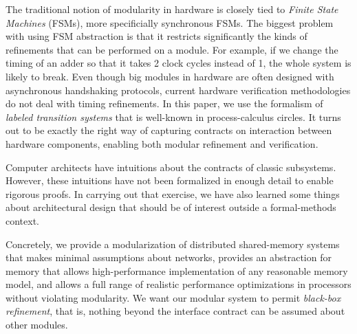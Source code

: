 The traditional notion of modularity in hardware is closely tied to
\emph{Finite State Machines} (FSMs), more specificially synchronous FSMs. The biggest
problem with using FSM abstraction is that it restricts significantly the kinds of
refinements that can be performed on a module. For example, if we change the
timing of an adder so that it takes 2 clock cycles instead of 1, the whole
system is likely to break. Even though big modules in hardware are often
designed with asynchronous handshaking protocols, current
hardware verification methodologies do not deal with timing refinements.
In this paper, we use the formalism of \emph{labeled transition systems} that
is well-known in process-calculus circles.  It turns out to be exactly the
right way of capturing contracts on interaction between hardware components,
enabling both modular refinement and verification.
 

Computer architects have intuitions about the contracts of classic
subsystems.  However, these intuitions have not been formalized
in enough detail to enable rigorous proofs.  In carrying out that exercise,
we have also learned some things about architectural design that should
be of interest outside a formal-methods context.

Concretely, we provide a modularization of distributed shared-memory systems
that makes minimal assumptions about networks, provides an abstraction for
memory that allows high-performance implementation of any reasonable memory
model, and allows a full range of realistic performance optimizations in
processors without violating modularity. We want our modular system to permit
\emph{black-box refinement}, that is, nothing beyond the interface contract can
be assumed about other modules.

